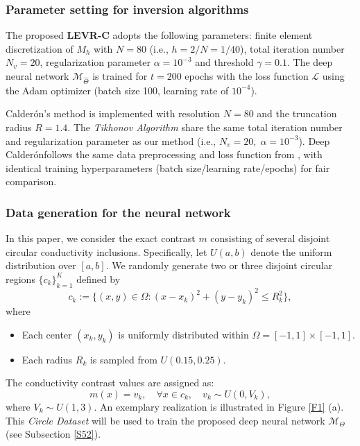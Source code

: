 \documentclass[11pt]{article}
\newcommand{\Calderon}{Calder\'{o}n}
\begin{document}
\subsubsection{Parameter setting for inversion algorithms}\label{S512}

The proposed \textbf{LEVR-C} adopts the following parameters: finite element discretization of $ M_h $ with $ N = 80 $ (i.e., $ h = 2/N = 1/40 $), total iteration number $ N_v = 20 $, regularization parameter $ \alpha=10^{-3} $ and threshold $ \gamma=0.1 $.
The deep neural network $\mathcal{M}_{\widehat{\Theta}}$ is trained for $ t=200 $ epochs with the loss function $\mathcal{L}$ using the Adam optimizer \cite{KDP14} (batch size 100, learning rate of $ 10^{-4} $). 

\Calderon's method is implemented with resolution $ N=80 $ and the truncation radius $ R = 1.4 $. 
The \textit{Tikhonov Algorithm} share the same total iteration number and regularization parameter as our method (i.e., $ N_v=20,\;\alpha=10^{-3} $).
Deep \Calderon\;follows the same data preprocessing and loss function from \cite{CSJ23}, with identical training hyperparameters (batch size/learning rate/epochs) for fair comparison.


\subsubsection{Data generation for the neural network}\label{S513}

In this paper, we consider the exact contrast $ m $ consisting of several disjoint circular conductivity inclusions.
Specifically, let $U(a,b)$ denote the uniform distribution over $ [a,b] $.
We randomly generate two or three disjoint circular regions $ \{c_k\}_{k=1}^K $ defined by
\begin{equation}\label{62}
c_k := \{(x,y)\in\Omega: (x-x_k)^2 + (y-y_k)^2 \leq R^2_k\},
\end{equation}
where
\begin{itemize}
\item Each center $ (x_k,y_k) $ is uniformly distributed within $\Omega = [-1,1]\times [-1,1]$.
\item Each radius $ R_k $ is sampled from $ U(0.15,0.25) $.
\end{itemize} 
The conductivity contrast values are assigned as:
\begin{equation}\label{63}
m(x) = v_k,\quad \forall x\in c_k,\quad v_k\sim U(0,V_k),
\end{equation}
where $ V_k\sim U(1, 3) $.
An exemplary realization is illustrated in Figure \ref{F1} (a). 
This \textit{Circle Dataset} will be used to train the proposed deep neural network $ \mathcal{M}_\Theta $ (see Subsection \ref{S52}).
\end{document}
